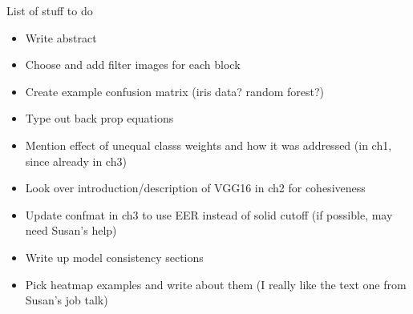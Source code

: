 
List of stuff to do

\begin{itemize}
\item Write abstract
\item Choose and add filter images for each block
\item Create example confusion matrix (iris data? random forest?)
\item Type out back prop equations
\item Mention effect of unequal classs weights and how it was addressed (in ch1, since already in ch3)
\item Look over introduction/description of VGG16 in ch2 for cohesiveness
\item Update confmat in ch3 to use EER instead of solid cutoff (if possible, may need Susan's help)
\item Write up model consistency sections
\item Pick heatmap examples and write about them (I really like the text one from Susan's job talk)
\end{itemize}
